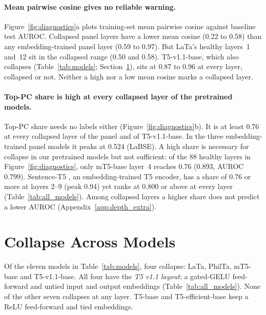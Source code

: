 \documentclass[11pt]{article}
\begin{document}
\paragraph{Mean pairwise cosine gives no reliable warning.}
Figure~\ref{fig:diagnostics}a plots training-set mean pairwise cosine against baseline test AUROC.
Collapsed panel layers have a lower mean cosine (0.22 to 0.58) than any embedding-trained panel layer (0.59 to 0.97).
But LaTa's healthy layers~1 and~12 sit in the collapsed range (0.50 and 0.58).
T5-v1.1-base, which also collapses (Table~\ref{tab:models}; Section~\ref{sec:models}), sits at 0.87 to 0.96 at every layer, collapsed or not.
Neither a high nor a low mean cosine marks a collapsed layer.

\paragraph{Top-PC share is high at every collapsed layer of the pretrained models.}
Top-PC share needs no labels either (Figure~\ref{fig:diagnostics}b).
It is at least 0.76 at every collapsed layer of the panel and of T5-v1.1-base.
In the three embedding-trained panel models it peaks at 0.524 (LaBSE).
A high share is necessary for collapse in our pretrained models but not sufficient: of the 88 healthy layers in Figure~\ref{fig:diagnostics}, only mT5-base layer~4 reaches 0.76 (0.893, AUROC 0.799).
Sentence-T5 \citep{ni2022sentencet5}, an embedding-trained T5 encoder, has a share of 0.76 or more at layers 2--9 (peak 0.94) yet ranks at 0.800 or above at every layer (Table~\ref{tab:all_models}).
Among collapsed layers a higher share does not predict a lower AUROC (Appendix~\ref{app:depth_extra}).

\section{Collapse Across Models}
\label{sec:models}

Of the eleven models in Table~\ref{tab:models}, four collapse: LaTa, PhilTa, mT5-base and T5-v1.1-base.
All four have the \emph{T5 v1.1 layout}: a gated-GELU feed-forward \citep{shazeer2020glu} and untied input and output embeddings \citep{t5v11release} (Table~\ref{tab:all_models}).
None of the other seven collapses at any layer.
T5-base and T5-efficient-base keep a ReLU feed-forward and tied embeddings.
\end{document}
